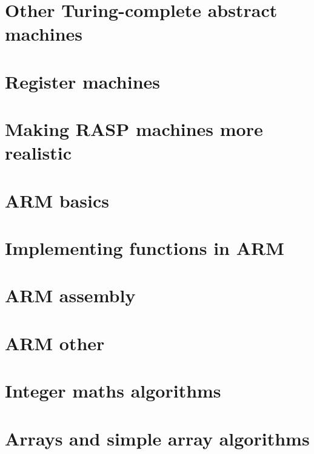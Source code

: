 \documentclass[oneside]{book}
\begin{document}
\part{Other Turing-complete abstract machines}


\part{Register machines}







\part{Making RASP machines more realistic}




\part{ARM basics}





\part{Implementing functions in ARM}




\part{ARM assembly}




\part{ARM other}


\part{Integer maths algorithms}






\part{Arrays and simple array algorithms}










\end{document}
